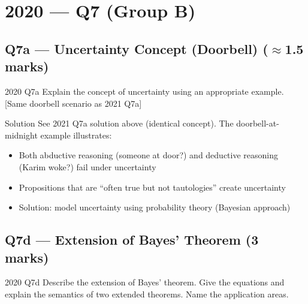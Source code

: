 \documentclass[12pt,a4paper]{article}
\begin{document}
\newpage
\section{2020 --- Q7 (Group B)}

\subsection{Q7a --- Uncertainty Concept (Doorbell) ($\approx$1.5 marks)}

\begin{qbox}{2020 Q7a}
Explain the concept of uncertainty using an appropriate example. [Same doorbell scenario as 2021 Q7a]
\end{qbox}

\begin{solbox}{Solution}
See 2021 Q7a solution above (identical concept). The doorbell-at-midnight example illustrates:
\begin{itemize}[noitemsep]
  \item Both abductive reasoning (someone at door?) and deductive reasoning (Karim woke?) fail under uncertainty
  \item Propositions that are ``often true but not tautologies'' create uncertainty
  \item Solution: model uncertainty using probability theory (Bayesian approach)
\end{itemize}
\end{solbox}

\subsection{Q7d --- Extension of Bayes' Theorem (3 marks)}

\begin{qbox}{2020 Q7d}
Describe the extension of Bayes' theorem. Give the equations and explain the semantics of two extended theorems. Name the application areas.
\end{qbox}
\end{document}
